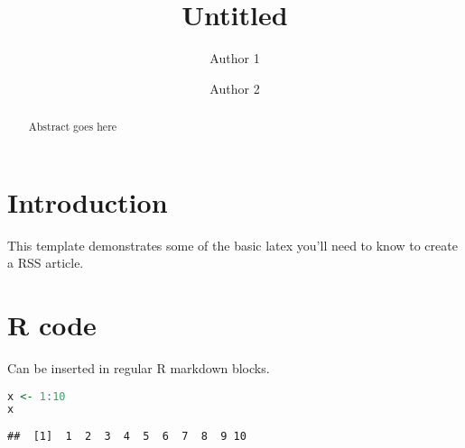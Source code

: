 \documentclass{statsoc}
\title[Untitled]{Untitled}
\author[Author 1 et. al.]{Author 1}
\author[Author 1 et. al.]{Author 2}
\begin{document}
\begin{abstract}
Abstract goes here
\end{abstract}

\hypertarget{introduction}{%
\section{Introduction}\label{introduction}}

This template demonstrates some of the basic latex you'll need to know
to create a RSS article.

\hypertarget{r-code}{%
\section{R code}\label{r-code}}

Can be inserted in regular R markdown blocks.

\begin{lstlisting}[language=
R
]
x <- 1:10
x
\end{lstlisting}

\begin{verbatim}
##  [1]  1  2  3  4  5  6  7  8  9 10
\end{verbatim}



\end{document}
